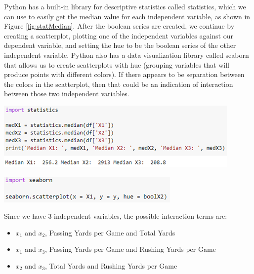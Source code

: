 \documentclass[a4paper,12pt]{report}
\begin{document}
Python has a built-in library for descriptive statistics called statistics, which we can use to easily get the median value for each independent variable, as shown in Figure \ref{fig:statMedian}. After the boolean series are created, we continue by creating a scatterplot, plotting one of the independent variables against our dependent variable, and setting the hue to be the boolean series of the other independent variable. Python also has a data visualization library called seaborn that allows us to create scatterplots with hue (grouping variables that will produce points with different colors). If there appears to be separation between the colors in the scatterplot, then that could be an indication of interaction between those two independent variables. 

\begin{center}
    \captionsetup{type=figure}
    \includegraphics[width=.9\linewidth]{media/statMedian.png}
    \label{fig:statMedian}
\end{center}

\begin{center}
    \captionsetup{type=figure}
    \includegraphics[width=.9\linewidth]{media/seaborn.png}
\end{center}

Since we have 3 independent variables, the possible interaction terms are:
\begin{itemize}[,]
    \setlength\itemsep{-.1cm}
    \item $x_1$ and $x_2$, Passing Yards per Game and Total Yards
    \item $x_1$ and $x_3$, Passing Yards per Game and Rushing Yards per Game
    \item $x_2$ and $x_3$, Total Yards and Rushing Yards per Game
\end{itemize}
\end{document}
